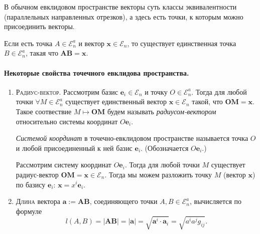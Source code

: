 В обычном евклидовом пространстве векторы суть классы эквивалентности
(параллельных направленных отрезков), а здесь есть точки, к которым
можно присоединить векторы.

Если есть точка $A \in \mathcal{E}_n^a$ и вектор $\mathbf{x} \in \mathcal{E}_n$,
то существует единственная точка $B \in \mathcal{E}_n^a$, такая что $\mathbf{AB} = \mathbf{x}$.

\paragraph{Некоторые свойства точечного евклидова пространства.}
\begin{enumerate}
  \item \textsc{Радиус-вектор.} Рассмотрим базис $\mathbf{e}_i \in \mathcal{E}_n$ и точку $O \in
    \mathcal{E}_n^a$. Тогда для любой точки
    $\forall M \in \mathcal{E}_n^a$ существует единственный вектор $ \mathbf{x}
    \in \mathcal{E}_n$ такой, что $ \mathbf{OM} = \mathbf{x}$.
    Такое соотвествие $M \mapsto \mathbf{OM}$ будем называть
    \emph{радиусом-вектором} относительно системы координат $O\mathbf{e}_i$.
    \begin{definition}
      \emph{Системой координат} в точечно-евклидовом пространстве называется точка $O$ и любой присоединенный к ней
      базис $\mathbf{e}_i$. (Обозначается $O\mathbf{e}_i$.)
    \end{definition}
    Рассмотрим систему координат $O\mathbf{e}_i$. Тогда для любой точки $M$ существует радиус-вектор $\mathbf{OM} = \mathbf{x} \in \mathcal{E}_n$.
    Тогда мы можем разложить точку $ M $ (вектор $\mathbf{x}$) по базису $\mathbf{e}_i$: $\mathbf{x} = x^i \mathbf{e}_i$.
    
    \begin{figure}[H]
    	\centering
    	
    \end{figure}

  \item \textsc{Длина} вектора $ \mathbf a := \mathbf{AB} $, соединяющего точки $A, B \in
    \mathcal{E}_n^a$, вычисляется по формуле
    \[
      l(A, B) = |\mathbf{AB}| = |\mathbf{a}| = \sqrt{\mathbf{a}^i \cdot
      \mathbf{a}_i} = \sqrt{a^i a^j g_{ij}}.

    \]
    
  	\begin{figure}[H]
  		\centering
  		
  	\end{figure}


\end{enumerate}
